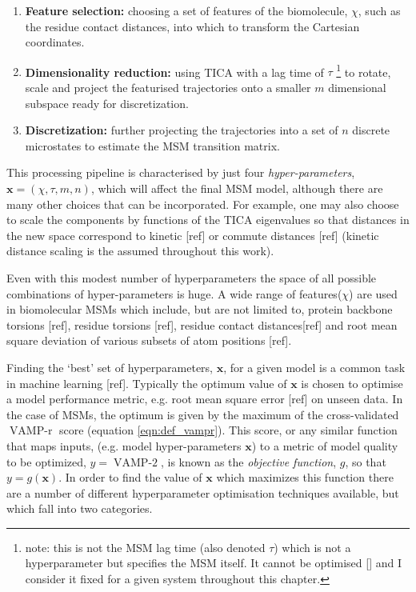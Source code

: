 \begin{enumerate}
    \item \textbf{Feature selection:} choosing a set of features of the biomolecule, $\chi$, such as the residue contact distances, into which to transform the Cartesian coordinates.  
    \item \textbf{Dimensionality reduction:} using  TICA with a lag time of $\tau$ \footnote{note: this is not the MSM lag time (also denoted $\tau$) which is not a hyperparameter but specifies the MSM itself. It cannot be optimised [] and I consider it fixed for a given system throughout this chapter.} to rotate, scale and project the featurised trajectories onto a smaller $m$ dimensional subspace ready for discretization.  
    \item \textbf{Discretization:} further projecting the trajectories into a set of $n$ discrete microstates to estimate the MSM transition matrix. 
\end{enumerate}
This processing pipeline is characterised by just four \emph{hyper-parameters}, $\mathbf{x} = (\chi, \tau, m, n)$, which will affect the final MSM model, although there are many other choices that can be incorporated. For example, one may also choose to scale the components by functions of the TICA eigenvalues so that distances in the new space correspond to kinetic [ref] or commute distances [ref] (kinetic distance scaling is the assumed throughout this work). 

Even with this modest number of hyperparameters the space of all possible combinations of hyper-parameters is huge. A wide range of features($\chi$) are used in biomolecular MSMs which include, but are not limited to, protein backbone torsions [ref], residue torsions [ref], residue contact distances[ref] and root mean square deviation of various subsets of atom positions [ref].

Finding the `best' set of hyperparameters, $\mathbf{x}$, for a given model is a common task in machine learning [ref]. Typically the optimum value of $\mathbf{x}$ is chosen to optimise a model performance metric, e.g. root mean square error [ref] on unseen data. In the case of MSMs, the optimum is given by the maximum of the cross-validated $\operatorname{VAMP-r}$ score (equation \ref{eqn:def_vampr}). This score, or any similar function that maps inputs, (e.g. model hyper-parameters $\mathbf{x}$) to a metric of model quality to be optimized, $y=\operatorname{VAMP-2}$, is known as the \emph{objective function}, $g$, so that $y=g(\mathbf{x})$. In order to find the value of $\mathbf{x}$ which maximizes this function there are a number of different hyperparameter optimisation techniques available, but which fall into two categories. 

